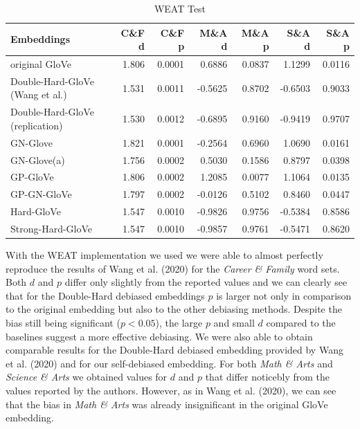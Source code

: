 \documentclass[
  english,
  man,floatsintext]{apa6}
\begin{document}
\begin{table}

\caption{\label{tab:unnamed-chunk-1}WEAT Test}
\centering
\begin{tabular}[t]{l|r|r|r|r|r|r}
\hline
Embeddings & C\&F d & C\&F p & M\&A d & M\&A p & S\&A d & S\&A p\\
\hline
original GloVe & 1.806 & 0.0001 & 0.6886 & 0.0837 & 1.1299 & 0.0116\\
\hline
Double-Hard-GloVe (Wang et al.) & 1.531 & 0.0011 & -0.5625 & 0.8702 & -0.6503 & 0.9033\\
\hline
Double-Hard-GloVe (replication) & 1.530 & 0.0012 & -0.6895 & 0.9160 & -0.9419 & 0.9707\\
\hline
GN-Glove & 1.821 & 0.0001 & -0.2564 & 0.6960 & 1.0690 & 0.0161\\
\hline
GN-Glove(a) & 1.756 & 0.0002 & 0.5030 & 0.1586 & 0.8797 & 0.0398\\
\hline
GP-GloVe & 1.806 & 0.0002 & 1.2085 & 0.0077 & 1.1064 & 0.0135\\
\hline
GP-GN-GloVe & 1.797 & 0.0002 & -0.0126 & 0.5102 & 0.8460 & 0.0447\\
\hline
Hard-GloVe & 1.547 & 0.0010 & -0.9826 & 0.9756 & -0.5384 & 0.8586\\
\hline
Strong-Hard-GloVe & 1.547 & 0.0010 & -0.9857 & 0.9761 & -0.5471 & 0.8620\\
\hline
\end{tabular}
\end{table}

With the WEAT implementation we used we were able to almost perfectly reproduce the results of Wang et al. (2020) for the \emph{Career \& Family} word sets. Both \(d\) and \(p\) differ only slightly from the reported values and we can clearly see that for the Double-Hard debiased embeddings \(p\) is larger not only in comparison to the original embedding but also to the other debiasing methods. Despite the bias still being significant (\(p<0.05\)), the large \(p\) and small \(d\) compared to the baselines suggest a more effective debiasing. We were also able to obtain comparable results for the Double-Hard debiased embedding provided by Wang et al. (2020) and for our self-debiased embedding.
For both \emph{Math \& Arts} and \emph{Science \& Arts} we obtained values for \(d\) and \(p\) that differ noticebly from the values reported by the authors. However, as in Wang et al. (2020), we can see that the bias in \emph{Math \& Arts} was already insignificant in the original GloVe embedding.
\end{document}
